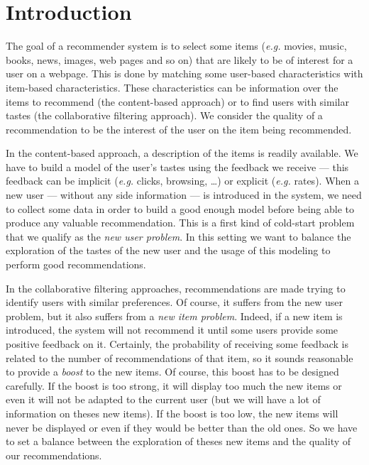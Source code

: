 \documentclass[twoside,leqno,twocolumn]{article}
\newcommand{\pp}[1]{\color{red}(pp) #1\color{black}}
\newcommand{\jm}[1]{{\color{TealBlue}(jm) #1\color{black}}}
\newcommand{\eg}{\textit{e.g.}}
\begin{document}
\section{Introduction}

The goal of a recommender system is to select some items (\eg{} movies,
music, books, news, images, web pages and so on) that are likely to be
of interest for a user on a webpage. This is done by matching some
user-based characteristics with item-based characteristics. These
characteristics can be information over the items to recommend (the
content-based approach) or to find users with similar tastes (the
collaborative filtering approach). 
   We consider the quality
of a recommendation to be the interest of the user on the item being
recommended.

In the content-based approach, a description of the items is readily
available. We have to build a model of the user's tastes using the
feedback we receive --- this feedback can be implicit (\eg{} clicks,
browsing, \ldots) or explicit (\eg{} rates). When a new user ---
without any side information --- is introduced in the system, we need
to collect some data in order to build a good enough model before
being able to produce any valuable recommendation. This is a first
kind of cold-start problem that we qualify as the \emph{new user
  problem}. In this setting we want to balance the exploration of the tastes of the new user and the usage of this modeling to perform good recommendations.  

In the collaborative filtering approaches, recommendations are made
trying to identify users with similar preferences. Of course, it
suffers from the new user problem, but it also suffers from a
\emph{new item problem}. Indeed, if a new item is introduced, the
system will not recommend it until some users provide some positive
feedback on it. Certainly, the probability of receiving some feedback
is related to the number of recommendations of that item, so it sounds
reasonable to provide a \emph{boost} to the new items. Of course, this
boost has to be designed carefully. If the boost is too strong, it will display too much the new items or even it will not be adapted to the current user (but we will have a lot of information on theses new items). If the boost is too low, the new items will never be displayed or even if they would be better than the old ones. So we  have to set a balance between the exploration of theses new items and the quality of our recommendations. 
\end{document}

